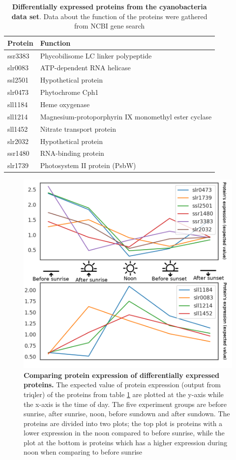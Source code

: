 \begin{center}
\begin{table}[H]
\caption{\textbf{Differentially expressed proteins from the cyanobacteria data set}. Data about the function of the proteins were gathered from NCBI gene search \cite{ncbi-search}}
\begin{tabular}{ l l }
\toprule
Protein & Function \\ \midrule
ssr3383 & Phycobilisome LC linker polypeptide \\ [0.5ex]
slr0083 & ATP-dependent RNA helicase \\ [0.5ex]
ssl2501 & Hypothetical protein \\ [0.5ex]
slr0473 & Phytochrome Cph1 \\ [0.5ex]
sll1184 & Heme oxygenase \\ [0.5ex]
sll1214 & Magnesium-protoporphyrin IX monomethyl ester cyclase \\ [0.5ex]
sll1452 & Nitrate transport protein \\ [0.5ex]
slr2032 & Hypothetical protein \\ [0.5ex]
ssr1480 & RNA-binding protein \\ [0.5ex]
slr1739 & Photosystem II protein (PsbW) \\ \bottomrule
\end{tabular}
\centering
\label{table:cyano-proteins}
\end{table}
\end{center}

\begin{figure}[H]
  \begin{center}
  \includegraphics[width=0.8\linewidth]{results/combined_edited.png}
  \caption{\textbf{Comparing protein expression of differentially expressed proteins.} The expected value of protein expression (output from triqler) of the proteins from table \ref{table:cyano-proteins} are plotted at the y-axis while the x-axis is the time of day. The five experiment groups are before sunrise, after sunrise, noon, before sundown and after sundown. The proteins are divided into two plots; the top plot is proteins with a lower expression in the noon compared to before sunrise, while the plot at the bottom is proteins which has a higher expression during noon when comparing to before sunrise}
  \label{fig:expression}
  \end{center}
\end{figure}
